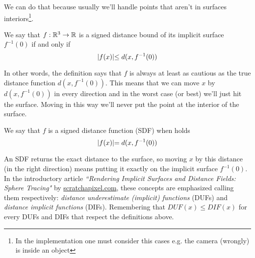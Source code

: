 We can do that because usually we'll handle points that aren't in surfaces interiors\footnote{
  In the implementation one must consider this cases e.g. the camera (wrongly) is inside an object
}.
\begin{definition}
We say that $f: \mathbb{R}^3 \to \mathbb{R}$ is a signed distance bound of its implicit surface $f^{-1}(0)$ if and only if
\begin{equation}\label{eq:sdb}
\lvert f(x) \lvert \leq d(x,f^{-1}(0))
\end{equation}
\end{definition}

\noindent
In other words, the definition says that $f$ is always at least as cautious as the true distance function $d(x,f^{-1}(0))$.
This means that we can move $x$ by $d(x,f^{-1}(0))$ in every direction and in the worst case (or best) we'll just hit the surface.
Moving in this way we'll never put the point at the interior of the surface.

\begin{definition}
We say that $f$ is a signed distance function (SDF) when holds
\begin{equation}\label{eq:sdf}
\lvert f(x) \lvert = d(x,f^{-1}(0))
\end{equation}
\end{definition}

\noindent
An SDF returns the exact distance to the surface, so moving $x$ by this distance (in the right direction) means putting it exactly on the implicit surface $f^{-1}(0)$.
In the introductory article
\emph{``Rendering Implicit Surfaces and Distance Fields: Sphere Tracing"}\cite{scratch_sdf}
by \url{scratchapixel.com},
these concepts are emphasized calling them respectively: 
\emph{distance underestimate (implicit) functions} (DUFs) and 
\emph{distance implicit functions} (DIFs).
Remembering that $DUF(x) \leq DIF(x)$ for every DUFs and DIFs that respect the definitions above.


